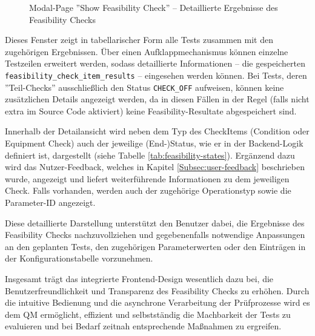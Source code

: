 \begin{figure}[!htbp] 
    \centering 
    \caption{Modal-Page ''Show Feasibility Check'' – Detaillierte Ergebnisse des Feasibility Checks} 
    \label{fig:result-details} 
\end{figure}

Dieses Fenster zeigt in tabellarischer Form alle Tests zusammen mit den zugehörigen Ergebnissen. Über einen Aufklappmechanismus können einzelne Testzeilen erweitert werden, sodass detaillierte Informationen – die gespeicherten \texttt{feasibility\_check\_item\_results} – eingesehen werden können. Bei Tests, deren ''Teil-Checks'' ausschließlich den Status \texttt{CHECK\_OFF} aufweisen, können keine zusätzlichen Details angezeigt werden, da in diesen Fällen in der Regel (falls nicht extra im Source Code aktiviert) keine Feasibility-Resultate abgespeichert sind.

Innerhalb der Detailansicht wird neben dem Typ des CheckItems (Condition oder Equipment Check) auch der jeweilige (End-)Status, wie er in der Backend-Logik definiert ist, dargestellt (siehe Tabelle \ref{tab:feasibility-states}). Ergänzend dazu wird das Nutzer-Feedback, welches in Kapitel \ref{Subsec:user-feedback} beschrieben wurde, angezeigt und liefert weiterführende Informationen zu dem jeweiligen Check. Falls vorhanden, werden auch der zugehörige Operationstyp sowie die Parameter-ID angezeigt.

Diese detaillierte Darstellung unterstützt den Benutzer dabei, die Ergebnisse des Feasibility Checks nachzuvollziehen und gegebenenfalls notwendige Anpassungen an den geplanten Tests, den zugehörigen Parameterwerten oder den Einträgen in der Konfigurationstabelle vorzunehmen.

Insgesamt trägt das integrierte Frontend-Design wesentlich dazu bei, die Benutzerfreundlichkeit und Transparenz des Feasibility Checks zu erhöhen. Durch die intuitive Bedienung und die asynchrone Verarbeitung der Prüfprozesse wird es dem \gls{QM} ermöglicht, effizient und selbstständig die Machbarkeit der Tests zu evaluieren und bei Bedarf zeitnah entsprechende Maßnahmen zu ergreifen.


